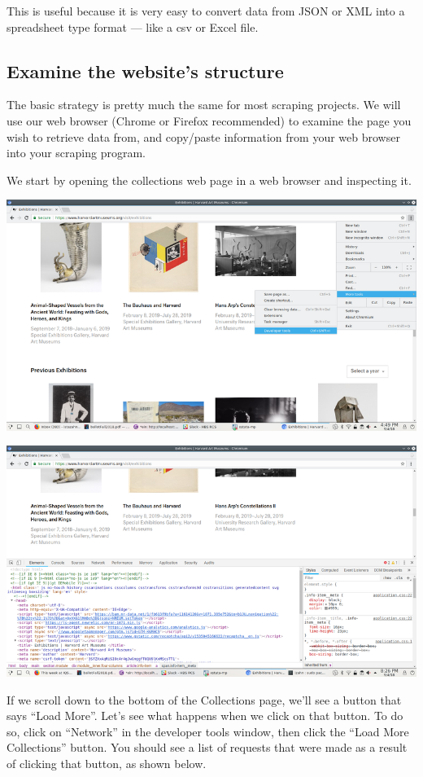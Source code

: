\documentclass[]{book}
\begin{document}
This is useful because it is very easy to convert data from JSON or XML into a spreadsheet type format --- like a csv or Excel file.

\hypertarget{examine-the-websites-structure}{%
\subsection{Examine the website's structure}\label{examine-the-websites-structure}}

The basic strategy is pretty much the same for most scraping projects. We will use our web browser (Chrome or Firefox recommended) to examine the page you wish to retrieve data from, and copy/paste information from your web browser into your scraping program.

We start by opening the collections web page in a web browser and inspecting it.

\includegraphics{Python/PythonWebScrape/images/dev_tools.png}

\includegraphics{Python/PythonWebScrape/images/dev_tools_pane.png}

If we scroll down to the bottom of the Collections page, we'll see a button that says ``Load More''. Let's see what happens when we click on that button. To do so, click on ``Network'' in the developer tools window, then click the ``Load More Collections'' button. You should see a list of requests that were made as a result of clicking that button, as shown below.
\end{document}
